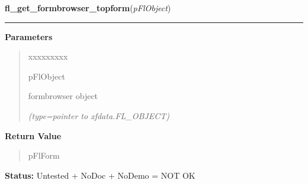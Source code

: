 \hspace{.8\funcindent}\begin{boxedminipage}{\funcwidth}

    \raggedright \textbf{fl\_get\_formbrowser\_topform}(\textit{pFlObject})

    \vspace{-1.5ex}

    \rule{\textwidth}{0.5\fboxrule}
\setlength{\parskip}{2ex}
\setlength{\parskip}{1ex}
      \textbf{Parameters}
      \vspace{-1ex}

      \begin{quote}
        \begin{Ventry}{xxxxxxxxx}

          \item[pFlObject]

          formbrowser object

            {\it (type=pointer to xfdata.FL\_OBJECT)}

        \end{Ventry}

      \end{quote}

      \textbf{Return Value}
    \vspace{-1ex}

      \begin{quote}
      pFlForm

      \end{quote}

\textbf{Status:} Untested + NoDoc + NoDemo = NOT OK



    \end{boxedminipage}

    \label{xformslib:flformbrowser:fl_set_formbrowser_topform}

    \vspace{0.5ex}

